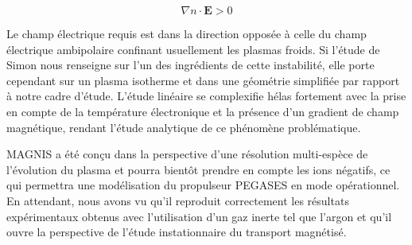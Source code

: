 \begin{refsection}
	\begin{equation}
		\nabla n\cdot \mathbf E>0
	\end{equation}
	
	Le champ électrique requis est dans la direction opposée à celle du champ
	électrique ambipolaire confinant usuellement les plasmas froids. Si l'étude de
	Simon nous renseigne sur l'un des ingrédients de cette instabilité, elle porte
	cependant sur un plasma isotherme et dans une géométrie simplifiée par rapport
	à notre cadre d'étude. L'étude linéaire se complexifie hélas fortement avec la
	prise en compte de la température électronique et la présence d'un gradient
	de champ magnétique, rendant l'étude analytique de ce phénomène problématique.

	MAGNIS a été conçu dans la perspective d'une résolution multi-espèce de
	l'évolution du plasma et pourra bientôt prendre en compte les ions
	négatifs, ce qui permettra une modélisation du propulseur PEGASES en mode
	opérationnel. En attendant, nous avons vu qu'il reproduit correctement les
	résultats expérimentaux obtenus avec l'utilisation d'un gaz inerte tel que
	l'argon et qu'il ouvre la perspective de l'étude instationnaire du transport
	magnétisé.
	

\end{refsection}
